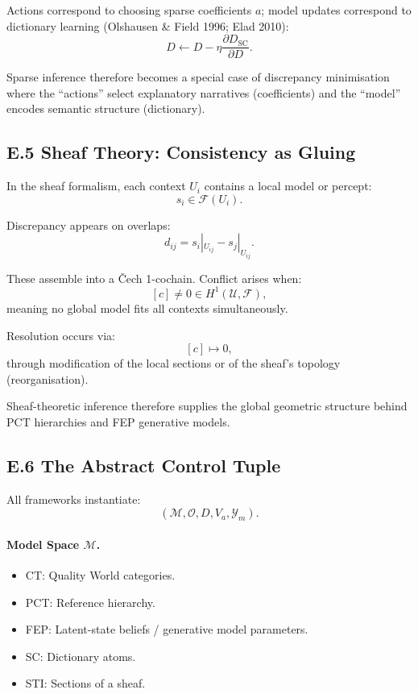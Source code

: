 \documentclass[11pt,a4paper,twoside]{article}
\begin{document}
Actions correspond to choosing sparse coefficients $a$; model updates correspond to dictionary learning (Olshausen \& Field 1996; Elad 2010):
\[
D \leftarrow D - \eta \frac{\partial D_{\mathrm{SC}}}{\partial D}.
\]

Sparse inference therefore becomes a special case of discrepancy minimisation where the “actions” select explanatory narratives (coefficients) and the “model” encodes semantic structure (dictionary).

\subsection*{E.5 Sheaf Theory: Consistency as Gluing}

In the sheaf formalism, each context $U_i$ contains a local model or percept:
\[
s_i \in \mathscr{F}(U_i).
\]

Discrepancy appears on overlaps:
\[
d_{ij} = s_i|_{U_{ij}} - s_j|_{U_{ij}}.
\]

These assemble into a Čech 1-cochain. Conflict arises when:
\[
[c] \neq 0 \in H^1(\mathcal{U}, \mathscr{F}),
\]
meaning no global model fits all contexts simultaneously.

Resolution occurs via:
\[
[c] \mapsto 0,
\]
through modification of the local sections or of the sheaf’s topology (reorganisation).

Sheaf-theoretic inference therefore supplies the global geometric structure behind PCT hierarchies and FEP generative models.

\subsection*{E.6 The Abstract Control Tuple}

All frameworks instantiate:
\[
(\mathcal{M}, \mathcal{O}, D, V_{\!a}, \mathcal{Y}_m).
\]

\paragraph{Model Space $\mathcal{M}$.}
\begin{itemize}
\item CT: Quality World categories.
\item PCT: Reference hierarchy.
\item FEP: Latent-state beliefs / generative model parameters.
\item SC: Dictionary atoms.
\item STI: Sections of a sheaf.
\end{itemize}
\end{document}
